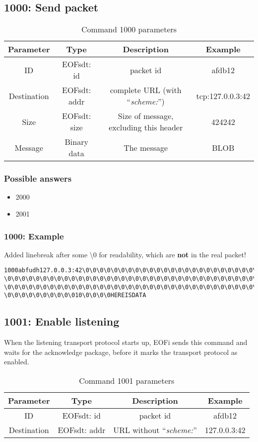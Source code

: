 \subsection{1000: Send packet}
\begin{longtable}{|c|c|c|c|}
\caption{Command 1000 parameters}\\
\hline
\textbf{Parameter} & \textbf{Type} & \textbf{Description} & \textbf{Example}\\
\hline
ID & EOFsdt: id & packet id & afdb12\\
\hline
Destination & EOFsdt: addr & complete URL (with "`\emph{scheme:}"') & tcp:127.0.0.3:42\\
\hline
Size & EOFsdt: size & Size of message, excluding this header & 424242\\
\hline
Message & Binary data & The message & BLOB\\
\hline
\end{longtable}
\subsubsection{Possible answers}
\begin{itemize}
\item 2000
\item 2001
\end{itemize}
\subsubsection{1000: Example}
Added linebreak after some \textbackslash{}0 for readability, which are \textbf{not} in
the real packet!
\begin{verbatim}
1000abfudh127.0.0.3:42\0\0\0\0\0\0\0\0\0\0\0\0\0\0\0\0\0\0\0\0\0\0\0\0\0\0\0\0
\0\0\0\0\0\0\0\0\0\0\0\0\0\0\0\0\0\0\0\0\0\0\0\0\0\0\0\0\0\0\0\0\0\0\0\0\0\0\0
\0\0\0\0\0\0\0\0\0\0\0\0\0\0\0\0\0\0\0\0\0\0\0\0\0\0\0\0\0\0\0\0\0\0\0\0\0\0\0
\0\0\0\0\0\0\0\0\0\010\0\0\0\0HEREISDATA
\end{verbatim}
\subsection{1001: Enable listening}
%
When the listening transport protocol starts up, EOFi sends this command and
waits for the acknowledge package, before it marks the transport protocol as enabled.
\begin{longtable}{|c|c|c|c|}
\caption{Command 1001 parameters}\\
\hline
\textbf{Parameter} & \textbf{Type} & \textbf{Description} & \textbf{Example}\\
\hline
ID & EOFsdt: id & packet id & afdb12\\
\hline
Destination & EOFsdt: addr & URL without "`\emph{scheme:}"' & 127.0.0.3:42\\
\hline
\end{longtable}
